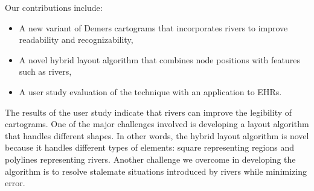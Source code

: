 Our contributions include:

\begin{itemize}
    \item A new variant of Demers cartograms that incorporates rivers to improve readability and recognizability,
    \item A novel hybrid layout algorithm that combines node positions with features such as rivers,
    \item A user study evaluation of the technique with an application to EHRs.
\end{itemize}

The results of the user study indicate that rivers can improve the legibility of cartograms.
One of the major challenges involved is developing a layout algorithm that handles different shapes.
In other words, the hybrid layout algorithm is novel because it handles different types of elements: square representing regions and polylines representing rivers.
Another challenge we overcome in developing the algorithm is to resolve stalemate situations introduced by rivers while minimizing error.